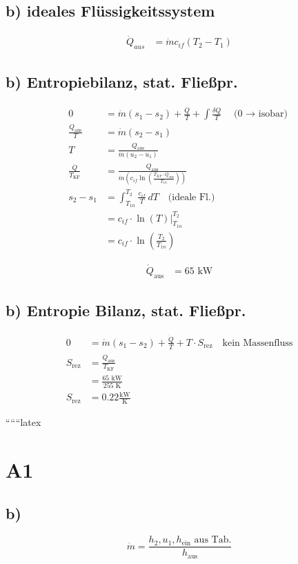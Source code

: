 \subsection*{b) ideales Flüssigkeitssystem}

\begin{align*}
    \dot{Q}_{aus} &= \dot{m} c_{if} (T_2 - T_1)
\end{align*}

\subsection*{b) Entropiebilanz, stat. Fließpr.}
\begin{align*}
    0 &= \dot{m} (s_1 - s_2) + \frac{\dot{Q}}{T} + \int \frac{\delta Q}{T} \quad \text{(0 $\rightarrow$ isobar)} \\
    \frac{Q_{\text{aus}}}{T} &= \dot{m} (s_2 - s_1) \\
    T &= \frac{Q_{\text{aus}}}{\dot{m} (u_2 - u_1)} \\
    \frac{\dot{Q}}{T_{\text{KF}}} &= \frac{Q_{\text{aus}}}{\dot{m} \left( c_{if} \ln \left( \frac{T_{KF} \cdot Q_{\text{aus}}}{T_{1n}} \right) \right)} \\
    s_2 - s_1 &= \int_{T_{1n}}^{T_2} \frac{c_{if}}{T} \, dT \quad \text{(ideale Fl.)} \\
    &= c_{if} \cdot \ln(T) \bigg|_{T_{1n}}^{T_2} \\
    &= c_{if} \cdot \ln \left( \frac{T_2}{T_{1n}} \right)
\end{align*}

\begin{align*}
    \dot{Q}_{\text{aus}} &= 65 \text{ kW}
\end{align*}

\subsection*{b) Entropie Bilanz, stat. Fließpr.}
\begin{align*}
    0 &= \dot{m} (s_1 - s_2) + \frac{\dot{Q}}{T} + T \cdot S_{\text{rez}} \quad \text{kein Massenfluss} \\
    S_{\text{rez}} &= \frac{\dot{Q}_{\text{aus}}}{T_{\text{KF}}} \\
    &= \frac{65 \text{ kW}}{255 \text{ K}} \\
    S_{\text{rez}} &= 0.22 \frac{\text{kW}}{\text{K}}
\end{align*}

``````latex


\section*{A1}



\subsection*{b)}
\[
\dot{m} = \frac{h_2, u_1, h_{\text{ein}} \text{ aus Tab.}}{h_{\text{aus}}}
\]
